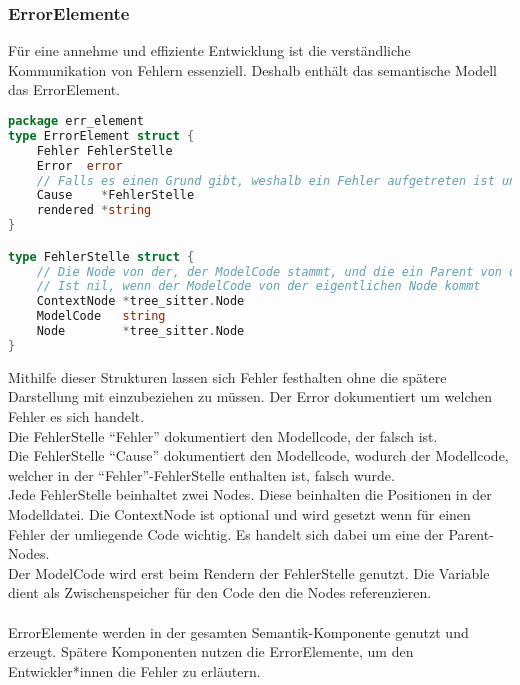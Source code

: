 \documentclass[./einleitung.tex]{subfiles}
\begin{document}
    \subsubsection{ErrorElemente}
    Für eine annehme und effiziente Entwicklung ist die verständliche Kommunikation von Fehlern essenziell.
    Deshalb enthält das semantische Modell das ErrorElement.
    \begin{lstlisting}[language=go]
package err_element
type ErrorElement struct {
	Fehler FehlerStelle
	Error  error
	// Falls es einen Grund gibt, weshalb ein Fehler aufgetreten ist und dieser Grund an einer anderen Stelle des Codes liegt
	Cause    *FehlerStelle
	rendered *string
}

type FehlerStelle struct {
	// Die Node von der, der ModelCode stammt, und die ein Parent von der eigentlichen Node ist.
	// Ist nil, wenn der ModelCode von der eigentlichen Node kommt
	ContextNode *tree_sitter.Node
	ModelCode   string
	Node        *tree_sitter.Node
}
    \end{lstlisting}
    Mithilfe dieser Strukturen lassen sich Fehler festhalten ohne die spätere Darstellung mit einzubeziehen zu müssen.
    Der Error dokumentiert um welchen Fehler es sich handelt. \\
    Die FehlerStelle ``Fehler'' dokumentiert den Modellcode, der falsch ist. \\
    Die FehlerStelle ``Cause'' dokumentiert den Modellcode, wodurch der Modellcode, welcher in der ``Fehler''-FehlerStelle enthalten ist, falsch wurde. \\
    Jede FehlerStelle beinhaltet zwei Nodes.
    Diese beinhalten die Positionen in der Modelldatei.
    Die ContextNode ist optional und wird gesetzt wenn für einen Fehler der umliegende Code wichtig.
    Es handelt sich dabei um eine der Parent-Nodes. \\
    Der ModelCode wird erst beim Rendern der FehlerStelle genutzt.
    Die Variable dient als Zwischenspeicher für den Code den die Nodes referenzieren. \\ \\
    ErrorElemente werden in der gesamten Semantik-Komponente genutzt und erzeugt.
    Spätere Komponenten nutzen die ErrorElemente, um den Entwickler*innen die Fehler zu erläutern.
\end{document}
